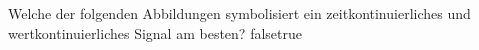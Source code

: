     {Welche der folgenden Abbildungen symbolisiert ein zeitkontinuierliches und wertkontinuierliches Signal am besten?}
    {}
    {}
    {}
    {}
    {false}{true}